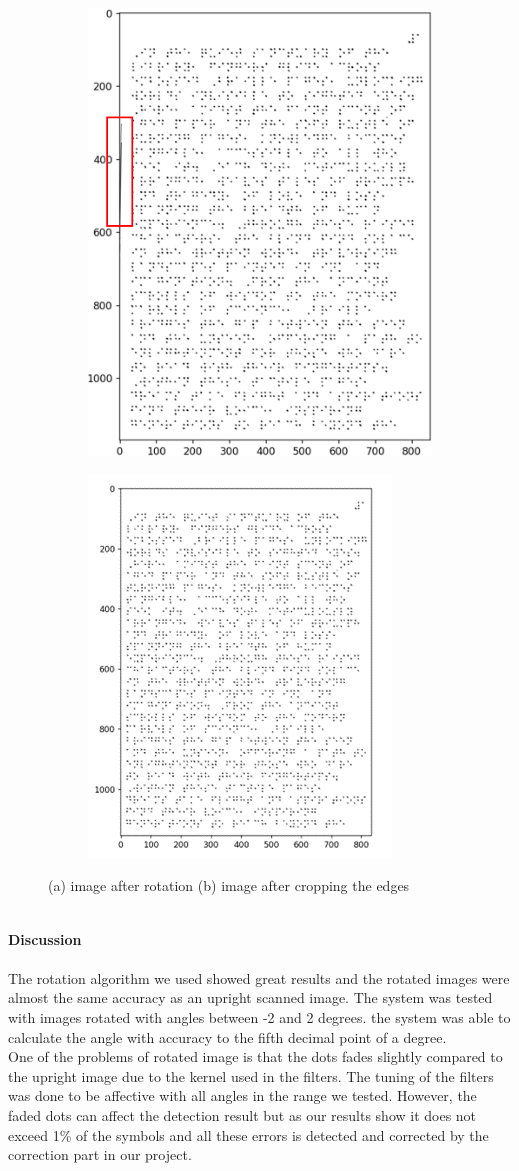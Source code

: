 \begin{figure}[h!]
     \centering
     \begin{subfigure}
         \centering
         \includegraphics[width=.45\textwidth]{Picture6.png}
     \end{subfigure}
     \hfill
     \begin{subfigure}
         \centering
         \includegraphics[width=.478\textwidth]{Picture7.png}
     \end{subfigure}
        \caption{(a) image after rotation \quad (b) image after cropping the edges }
        \label{fig:orientation}
\end{figure}
\textbf{\\ Discussion \\}
\\
\quad The rotation algorithm we used showed great results and the rotated images were almost the same accuracy as an upright scanned image. The system was tested with images rotated with angles between -2 and 2 degrees. the system was able to calculate the angle with accuracy to the fifth decimal point of a degree. \\
\quad One of the problems of rotated image is that the dots fades slightly compared to the upright image due to the kernel used in the filters. The tuning of the filters was done to be affective with all angles in the range we tested. However, the faded dots can affect the detection result but as our results show it does not exceed 1\% of the symbols and all these errors is detected and corrected by the correction part in our project.   \\